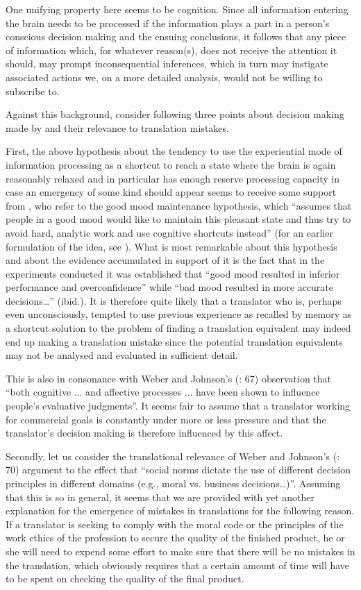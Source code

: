 \documentclass[output=paper]{LSP/langsci}
\begin{document}
  One unifying property here seems to be cognition. Since all information entering the brain needs to be processed if the information plays a part in a person's conscious decision making and the ensuing conclusions, it follows that any piece of information which, for whatever reason(s), does not receive the attention it should, may prompt inconsequential inferences, which in turn may instigate associated actions we, on a more detailed analysis, would not be willing to subscribe to.

  Against this background, consider following three points about decision making made by \citet{Weber2009} and their relevance to translation mistakes.

  First, the above hypothesis about the tendency to use the experiential mode of information processing as a shortcut to reach a state where the brain is again reasonably relaxed and in particular has enough reserve processing capacity in case an emergency of some kind should appear seems to receive some support from \citet[66]{Weber2009}, who refer to the good mood maintenance hypothesis, which “assumes that people in a good mood would like to maintain this pleasant state and thus try to avoid hard, analytic work and use cognitive shortcuts instead” (for an earlier formulation of the idea, see \cite[1122, 1128-1130]{Isen1987}). What is most remarkable about this hypothesis and about the evidence accumulated in support of it is the fact that in the experiments conducted it was established that ``good mood resulted in inferior performance and overconfidence'' while ``bad mood resulted in more accurate decisions\ldots'' (ibid.). It is therefore quite likely that a translator who is, perhaps even unconsciously, tempted to use previous experience as recalled by memory as a shortcut solution to the problem of finding a translation equivalent may indeed end up making a translation mistake since the potential translation equivalents may not be analysed and evaluated in sufficient detail.

  This is also in consonance with Weber and Johnson's (\citeyear{Weber2009}: 67) observation that ``both cognitive ...  and affective processes ...  have been shown to influence people's evaluative judgments''. It seems fair to assume that a translator working for commercial goals is constantly under more or less pressure and that the translator's decision making is therefore influenced by this affect.

  Secondly, let us consider the translational relevance of Weber and Johnson's (\citeyear{Weber2009}: 70) argument to the effect that ``social norms dictate the use of different decision principles in different domains (e.g., moral vs. business decisions\ldots)''. Assuming that this is so in general, it seems that we are provided with yet another explanation for the emergence of mistakes in translations for the following reason. If a translator is seeking to comply with the moral code or the principles of the work ethics of the profession to secure the quality of the finished product, he or she will need to expend some effort to make sure that there will be no mistakes in the translation, which obviously requires that a certain amount of time will have to be spent on checking the quality of the final product.
\end{document}
